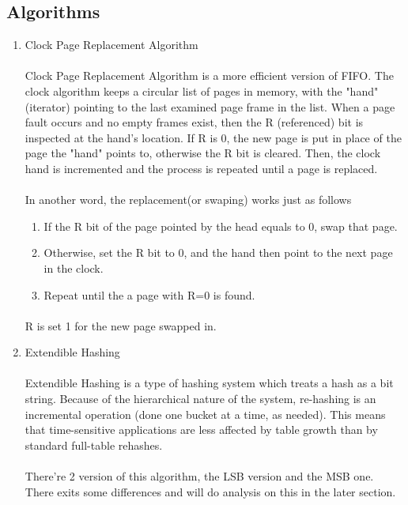 \documentclass{article}
\begin{document}
    \subsection{Algorithms}
        \begin{enumerate}
            \item Clock Page Replacement Algorithm
                \paragraph{}
                    Clock Page Replacement Algorithm is a more efficient version of FIFO. The clock algorithm keeps a circular list of pages in memory, with the "hand" (iterator) pointing to the last examined page frame in the list. When a page fault occurs and no empty frames exist, then the R (referenced) bit is inspected at the hand's location. If R is 0, the new page is put in place of the page the "hand" points to, otherwise the R bit is cleared. Then, the clock hand is incremented and the process is repeated until a page is replaced.
                \paragraph{}
                    In another word, the replacement(or swaping) works just as follows
                    \begin{enumerate}
                        \item If the R bit of the page pointed by the head equals to 0, swap that page.
                        \item Otherwise, set the R bit to 0, and the hand then point to the next page in the clock.
                        \item Repeat until the a page with R=0 is found.
                    \end{enumerate}
                \paragraph{}
                    R is set 1 for the new page swapped in.
            \item Extendible Hashing
                \paragraph{}
                    Extendible Hashing is a type of hashing system which treats a hash as a bit string. Because of the hierarchical nature of the system, re-hashing is an incremental operation (done one bucket at a time, as needed). This means that time-sensitive applications are less affected by table growth than by standard full-table rehashes.
                \paragraph{}
                    There're 2 version of this algorithm, the LSB version and the MSB one. There exits some differences and will do analysis on this in the later section.
        \end{enumerate}
\end{document}
